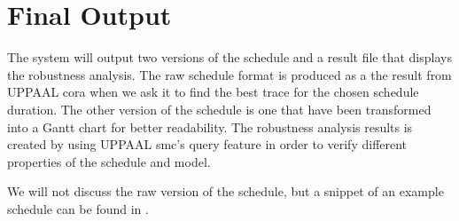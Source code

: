 \section{Final Output}\label{sec:final}
The system will output two versions of the schedule and a result file that displays the robustness analysis. The raw schedule format is produced as a the result from UPPAAL \gls{cora} when we ask it to find the best trace for the chosen schedule duration. The other version of the schedule is one that have been transformed into a Gantt chart for better readability. The robustness analysis results is created by using UPPAAL \gls{smc}'s query feature in order to verify different properties of the schedule and model.

We will not discuss the raw version of the schedule, but a snippet of an example schedule can be found in .



